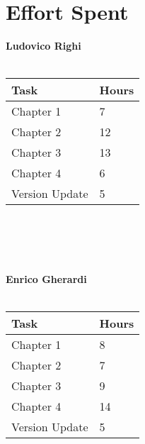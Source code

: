 \chapter{Effort Spent}

\textbf{Ludovico Righi} \\ \\
\begin{tabular}{ |p{5cm}|p{3cm}| }
 \hline
 Task&Hours\\
 \hline
 Chapter 1   &  7 \\
 Chapter 2   & 12   \\ 
 Chapter 3  & 13   \\
 Chapter 4 & 6   \\
 Version Update & 5 \\
 \hline
\end{tabular} \\ \\ \\ \\
\textbf{Enrico Gherardi} \\ \\
\begin{tabular}{ |p{5cm}|p{3cm}| }
 \hline
 Task&Hours\\
 \hline
 Chapter 1   & 8  \\
 Chapter 2   & 7   \\ 
 Chapter 3  & 9   \\
 Chapter 4 & 14   \\
 Version Update & 5 \\
 \hline
\end{tabular} \\ \\ \\ \\